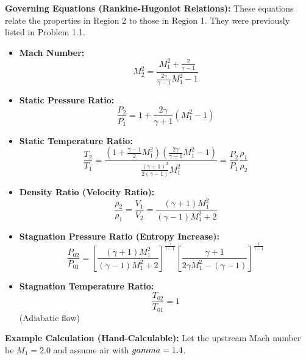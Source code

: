 \textbf{Governing Equations (Rankine-Hugoniot Relations):} These
equations relate the properties in Region 2 to those in Region 1. They
were previously listed in Problem 1.1.

\begin{itemize}
\tightlist
\item
  \textbf{Mach Number:}
  \[ M_2^2 = \frac{M_1^2 + \frac{2}{\gamma - 1}}{\frac{2\gamma}{\gamma - 1}M_1^2 - 1} \]
\item
  \textbf{Static Pressure Ratio:}
  \[ \frac{P_2}{P_1} = 1 + \frac{2\gamma}{\gamma + 1}(M_1^2 - 1) \]
\item
  \textbf{Static Temperature Ratio:}
  \[ \frac{T_2}{T_1} = \frac{\left(1 + \frac{\gamma-1}{2}M_1^2\right) \left(\frac{2\gamma}{\gamma-1}M_1^2 - 1\right)}{\frac{(\gamma+1)^2}{2(\gamma-1)} M_1^2} = \frac{P_2}{P_1} \frac{\rho_1}{\rho_2} \]
\item
  \textbf{Density Ratio (Velocity Ratio):}
  \[ \frac{\rho_2}{\rho_1} = \frac{V_1}{V_2} = \frac{(\gamma + 1)M_1^2}{(\gamma - 1)M_1^2 + 2} \]
\item
  \textbf{Stagnation Pressure Ratio (Entropy Increase):}
  \[ \frac{P_{02}}{P_{01}} = \left[ \frac{(\gamma + 1)M_1^2}{(\gamma - 1)M_1^2 + 2} \right]^{\frac{\gamma}{\gamma - 1}} \left[ \frac{\gamma + 1}{2\gamma M_1^2 - (\gamma - 1)} \right]^{\frac{1}{\gamma - 1}} \]
\item
  \textbf{Stagnation Temperature Ratio:} \[ \frac{T_{02}}{T_{01}} = 1 \]
  (Adiabatic flow)
\end{itemize}

\textbf{Example Calculation (Hand-Calculable):} Let the upstream Mach
number be \(M_1 = 2.0\) and assume air with \(\\gamma = 1.4\).

